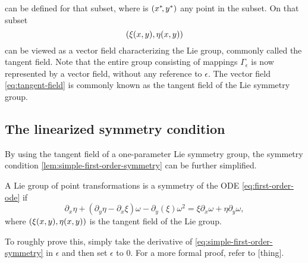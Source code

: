 can be defined for that subset, where is \(\pqty{x^*\!,y^*}\) any point in the subset. %
On that subset
\begin{equation} \label{eq:tangent-field}
  \pqty{\xi(x,y), \eta(x,y)}
\end{equation}
can be viewed as a vector field characterizing the Lie group, commonly called the tangent field.
Note that the entire group consisting of mappings \(\Gamma_\epsilon\) is now represented by a vector field, without any reference to \(\epsilon\).
The vector field \ref{eq:tangent-field} is commonly known as the tangent field of the Lie symmetry group.%

\subsection{The linearized symmetry condition}

By using the tangent field of a one-parameter Lie symmetry group, the symmetry condition \ref{lem:simple-first-order-symmetry} can be further simplified.
\begin{lem} \label{lem:linearized-first-order-symmetry}
  A Lie group of point transformations is a symmetry of the ODE \ref{eq:first-order-ode} if
  \begin{equation}
    \partial_x \eta + (\partial_y \eta - \partial_x \xi) \omega - \partial_y (\xi) \omega^2 =
    \xi \partial_x \omega + \eta \partial_y \omega,
  \end{equation}
  where \(\pqty{\xi(x,y), \eta(x,y)}\) is the tangent field of the Lie group.
\end{lem} %
To roughly prove this, simply take the derivative of \cref{eq:simple-first-order-symmetry} in \(\epsilon\) and then set \(\epsilon\) to 0.
For a more formal proof, refer to [thing]. %

